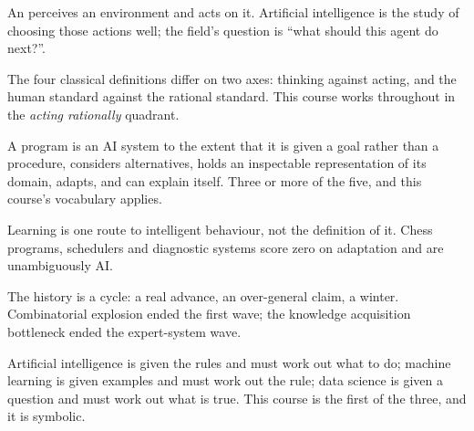 \begin{chaptersummary}
\begin{tight}
  \item An  perceives an environment and acts on it. Artificial
        intelligence is the study of choosing those actions well; the field's
        question is ``what should this agent do next?''.
  \item The four classical definitions differ on two axes: thinking against
        acting, and the human standard against the rational standard. This course
        works throughout in the \emph{acting rationally} quadrant.
  \item A program is an AI system to the extent that it is given a goal rather
        than a procedure, considers alternatives, holds an inspectable
        representation of its domain, adapts, and can explain itself. Three or
        more of the five, and this course's vocabulary applies.
  \item Learning is one route to intelligent behaviour, not the definition of it.
        Chess programs, schedulers and diagnostic systems score zero on
        adaptation and are unambiguously AI.
  \item The history is a cycle: a real advance, an over-general claim, a winter.
        Combinatorial explosion ended the first wave; the knowledge acquisition
        bottleneck ended the expert-system wave.
  \item Artificial intelligence is given the rules and must work out what to do;
        machine learning is given examples and must work out the rule; data
        science is given a question and must work out what is true. This course is
        the first of the three, and it is symbolic.
\end{tight}
\end{chaptersummary}

